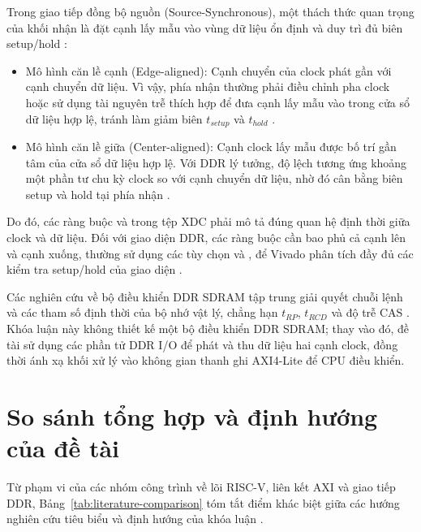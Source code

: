 Trong giao tiếp đồng bộ nguồn (Source-Synchronous), một thách thức quan trọng của khối nhận là đặt cạnh lấy mẫu vào vùng dữ liệu ổn định và duy trì đủ biên setup/hold \cite{arumugham2000ddrtiming,amd_ug471,amd_ug903}:
\begin{itemize}
    \item {Mô hình căn lề cạnh (Edge-aligned):} Cạnh chuyển của clock phát gần với cạnh chuyển dữ liệu. Vì vậy, phía nhận thường phải điều chỉnh pha clock hoặc sử dụng tài nguyên trễ thích hợp để đưa cạnh lấy mẫu vào trong cửa sổ dữ liệu hợp lệ, tránh làm giảm biên $t_{setup}$ và $t_{hold}$ \cite{arumugham2000ddrtiming,amd_ug471}.
    \item {Mô hình căn lề giữa (Center-aligned):} Cạnh clock lấy mẫu được bố trí gần tâm của cửa sổ dữ liệu hợp lệ. Với DDR lý tưởng, độ lệch tương ứng khoảng một phần tư chu kỳ clock so với cạnh chuyển dữ liệu, nhờ đó cân bằng biên setup và hold tại phía nhận \cite{arumugham2000ddrtiming,amd_ug903}.
\end{itemize}

Do đó, các ràng buộc  và  trong tệp XDC phải mô tả đúng quan hệ định thời giữa clock và dữ liệu. Đối với giao diện DDR, các ràng buộc cần bao phủ cả cạnh lên và cạnh xuống, thường sử dụng các tùy chọn  và , để Vivado phân tích đầy đủ các kiểm tra setup/hold của giao diện \cite{amd_ug903,amd_vivado_docs}.

Các nghiên cứu về bộ điều khiển DDR SDRAM tập trung giải quyết chuỗi lệnh và các tham số định thời của bộ nhớ vật lý, chẳng hạn $t_{RP}$, $t_{RCD}$ và độ trễ CAS \cite{shashikumar2010ahbddr,bonatto2008ddrinterface,naresh2016ddrcontroller}. Khóa luận này không thiết kế một bộ điều khiển DDR SDRAM; thay vào đó, đề tài sử dụng các phần tử DDR I/O để phát và thu dữ liệu hai cạnh clock, đồng thời ánh xạ khối xử lý vào không gian thanh ghi AXI4-Lite để CPU điều khiển.

\section{So sánh tổng hợp và định hướng của đề tài}

Từ phạm vi của các nhóm công trình về lõi RISC-V, liên kết AXI và giao tiếp DDR, Bảng~\ref{tab:literature-comparison} tóm tắt điểm khác biệt giữa các hướng nghiên cứu tiêu biểu và định hướng của khóa luận \cite{picorv32_repo,petrisko2020blackparrot,maisto2026simplyv,emil2023axiinterconnect,shashikumar2010ahbddr,ejaz2018ddrnoc,psarras2017nocddr}.

